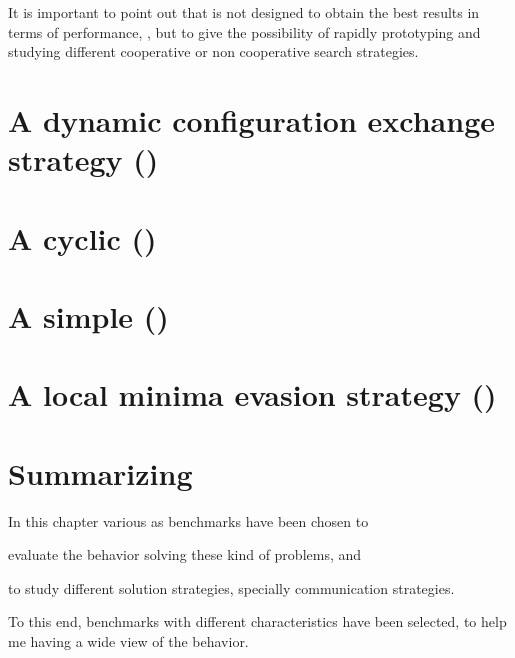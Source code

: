 It is important to point out that \posl{} is not designed to obtain the best results in terms of performance, , but to give the possibility of rapidly prototyping and studying different cooperative or non cooperative search strategies.


\section{A dynamic configuration exchange strategy (\sg)}


\section{A cyclic \comstr{} (\nq)}\label{sec:nqueens} %


\section{A simple \comstr{} (\carr)}\label{sec:costas} %


\section{A local minima evasion strategy (\gr)}\label{sec:golomb} %


\section{Summarizing}

In this chapter various \CSPs{} as benchmarks have been chosen to \begin{inparaenum}[1.] \item evaluate the \posl{} behavior solving these kind of problems, and \item to study different solution strategies, specially communication strategies. \end{inparaenum} To this end, benchmarks with different characteristics have been selected, to help me having a wide view of the \posl{} behavior.

